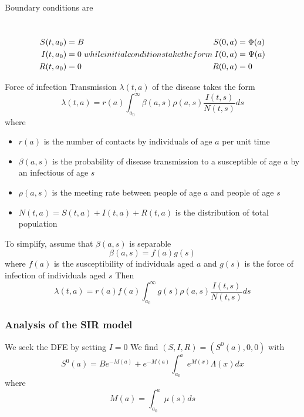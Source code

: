 \documentclass[aspectratio=169]{beamer}\usepackage[]{graphicx}\usepackage[]{xcolor}
\begin{document}
\begin{frame}
Boundary conditions are
\addtocounter{equation}{-1}\
\begin{subequations}
\setcounter{equation}{3}
\begin{align}
S(t,a_0)&=B \label{sys:SIR_age_structure_BCS} \\
I(t,a_0)&=0 \label{sys:SIR_age_structure_BCI} \\
R(t,a_0)&=0 \label{sys:SIR_age_structure_BCR}
\end{align}
while initial conditions take the form
\begin{align}
S(0,a)&=\Phi(a) \label{sys:SIR_age_structure_ICS} \\
I(0,a)&=\Psi(a) \label{sys:SIR_age_structure_ICI} \\
R(0,a)&=0 \label{sys:SIR_age_structure_ICR}
\end{align}
\end{subequations}
\end{frame}

\begin{frame}{Force of infection}
Transmission $\lambda(t,a)$ of the disease takes the form
\[
\lambda(t,a)=r(a)\int_{a_0}^\infty \beta(a,s)\rho(a,s)
\frac{I(t,s)}{N(t,s)}ds
\]
where 
\begin{itemize}
\item $r(a)$ is the number of contacts by individuals of age $a$ per unit time
\item $\beta(a,s)$ is the probability of disease transmission to a susceptible of age $a$ by an infectious of age $s$
\item $\rho(a,s)$ is the meeting rate between people of age $a$ and people of age $s$
\item $N(t,a)=S(t,a)+I(t,a)+R(t,a)$ is the distribution of total population
\end{itemize}
\end{frame}


\begin{frame}
To simplify, assume that $\beta(a,s)$ is separable
\[
\beta(a,s)=f(a)g(s)
\]
where $f(a)$ is the susceptibility of individuals aged $a$ and $g(s)$ is the force of infection of individuals aged $s$
\vfill
Then
\begin{equation}\label{eq:beta_age_dep}
\lambda(t,a)=r(a)f(a)\int_{a_0}^\infty g(s)\rho(a,s)
\frac{I(t,s)}{N(t,s)}ds
\end{equation}
\end{frame}

\begin{frame}\frametitle{Analysis of the SIR model}
We seek the DFE by setting $I=0$
\vfill
We find $(S,I,R)=(S^0(a),0,0)$ with
\[
S^0(a)=Be^{-M(a)} +e^{-M(a)}\int_{a_0}^a e^{M(x)}\Lambda(x)dx
\]
where
\[
M(a)=\int_{a_0}^a \mu(s)ds
\]
\end{frame}
\end{document}
